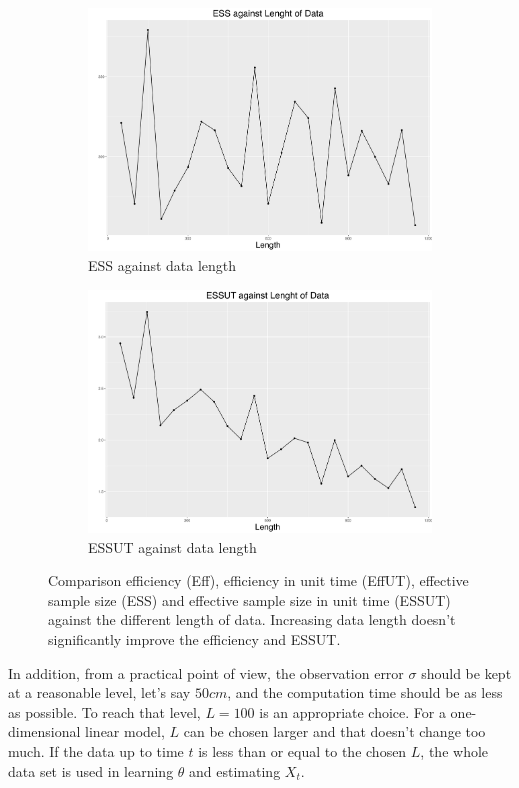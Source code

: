\begin{figure}[h]
\begin{subfigure}[t]{0.45\textwidth}
    \includegraphics[width=\textwidth]{Chapters/05MCMCOU/plots/simudataOUlengthess.pdf}
    \caption{ESS against data length}
\end{subfigure}
\begin{subfigure}[t]{0.45\textwidth}
    \includegraphics[width=\textwidth]{Chapters/05MCMCOU/plots/simudataOUlengthessut.pdf}
    \caption{ESSUT against data length}
\end{subfigure}
\caption{Comparison efficiency (Eff), efficiency in unit time (EffUT), effective sample size (ESS) and effective sample size in unit time (ESSUT) against the different length of data. Increasing data length doesn't significantly improve the efficiency and ESSUT.}\label{compareLengthData}
\end{figure}
In addition, from a practical point of view, the observation error $\sigma$ should be kept at a reasonable level, let's say $50cm$, and the computation time should be as less as possible. To reach that level, $L=100$ is an appropriate choice. For a one-dimensional linear model, $L$ can be chosen larger and that doesn't change too much. If the data up to time $t$ is less than or equal to the chosen $L$, the whole data set is used in learning $\theta$ and estimating $X_t$. 



